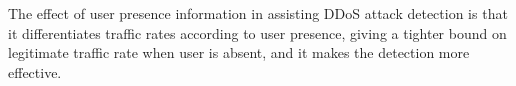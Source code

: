 
The effect of user presence information in assisting DDoS attack detection is that it differentiates traffic rates according to user presence, giving a tighter bound on legitimate traffic rate when user is absent, and it makes the detection more effective. 
